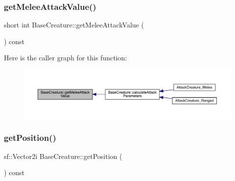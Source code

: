 \mbox{\label{class_base_creature_a7b4f974b77953aea8f4c698e6e21c500}} 
\subsubsection{\texorpdfstring{get\+Melee\+Attack\+Value()}{getMeleeAttackValue()}}
{\footnotesize\ttfamily short int Base\+Creature\+::get\+Melee\+Attack\+Value (\begin{DoxyParamCaption}{ }\end{DoxyParamCaption}) const}

Here is the caller graph for this function\+:
\nopagebreak
\begin{figure}[H]
\begin{center}
\leavevmode
\includegraphics[width=350pt]{d2/d3b/class_base_creature_a7b4f974b77953aea8f4c698e6e21c500_icgraph}
\end{center}
\end{figure}
\mbox{\label{class_base_creature_a00ebdc186dd6d3c0ef3c3d1262d4363f}} 
\subsubsection{\texorpdfstring{get\+Position()}{getPosition()}}
{\footnotesize\ttfamily sf\+::\+Vector2i Base\+Creature\+::get\+Position (\begin{DoxyParamCaption}{ }\end{DoxyParamCaption}) const}

